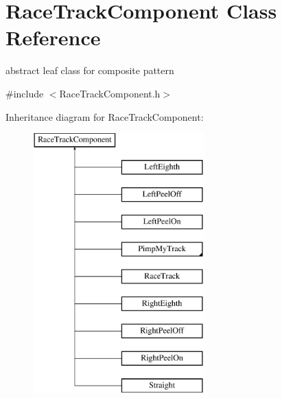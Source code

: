 \hypertarget{class_race_track_component}{}\section{Race\+Track\+Component Class Reference}
\label{class_race_track_component}


abstract leaf class for composite pattern  




{\ttfamily \#include $<$Race\+Track\+Component.\+h$>$}

Inheritance diagram for Race\+Track\+Component\+:\begin{figure}[H]
\begin{center}
\leavevmode
\includegraphics[height=10.000000cm]{class_race_track_component}
\end{center}
\end{figure}
